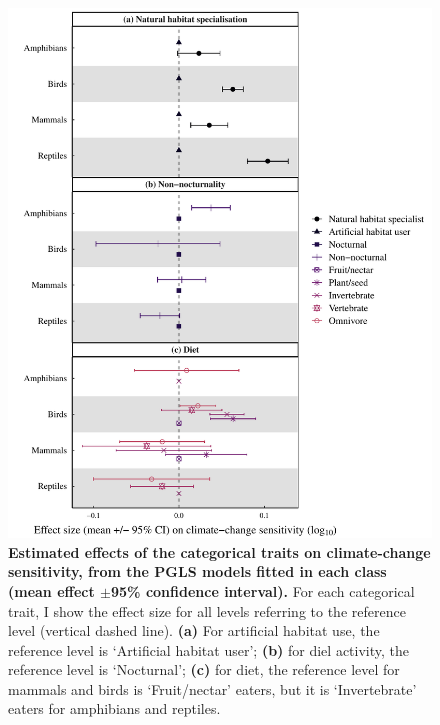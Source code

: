 \begin{figure}[h!]
\centering
\includegraphics[scale=0.75]{figures/Chapter4/Figure5_V2}
\caption[Estimated effects of the categorical traits on climate-change sensitivity, from the PGLS models fitted in each class.]{\textbf{Estimated effects of the categorical traits on climate-change sensitivity, from the PGLS models fitted in each class (mean effect $\pm$95\% confidence interval).} For each categorical trait, I show the effect size for all levels referring to the reference level (vertical dashed line). \textbf{(a)} For artificial habitat use, the reference level is `Artificial habitat user'; \textbf{(b)} for diel activity, the reference level is `Nocturnal'; \textbf{(c)} for diet, the reference level for mammals and birds is `Fruit/nectar' eaters, but it is `Invertebrate' eaters for amphibians and reptiles. }
\label{chap4_fig5}
\end{figure}


